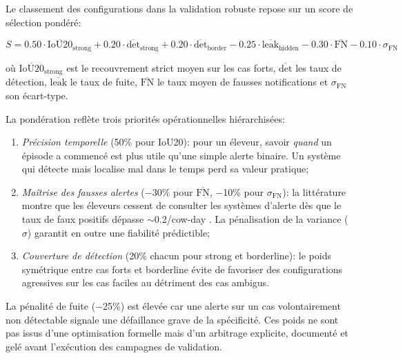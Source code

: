 Le classement des configurations dans la validation robuste repose sur un score de
sélection pondéré:

\begin{equation}
    S = 0.50 \cdot \overline{\text{IoU20}}_{\text{strong}}
      + 0.20 \cdot \overline{\text{det}}_{\text{strong}}
      + 0.20 \cdot \overline{\text{det}}_{\text{border}}
      - 0.25 \cdot \overline{\text{leak}}_{\text{hidden}}
      - 0.30 \cdot \overline{\text{FN}}
      - 0.10 \cdot \sigma_{\text{FN}}
    \label{eq:selection_score}
\end{equation}

\noindent
où $\overline{\text{IoU20}}_{\text{strong}}$ est le recouvrement strict moyen sur les cas
forts, $\overline{\text{det}}$ les taux de détection, $\overline{\text{leak}}$ le taux de
fuite, $\overline{\text{FN}}$ le taux moyen de fausses notifications et $\sigma_{\text{FN}}$
son écart-type.

La pondération reflète trois priorités opérationnelles hiérarchisées:
\begin{enumerate}
    \item \textit{Précision temporelle} (50\% pour IoU20): pour un éleveur, savoir
    \textit{quand} un épisode a commencé est plus utile qu'une simple alerte binaire.
    Un système qui détecte mais localise mal dans le temps perd sa valeur pratique;
    \item \textit{Maîtrise des fausses alertes} ($-$30\% pour $\overline{\text{FN}}$,
    $-$10\% pour $\sigma_{\text{FN}}$): la littérature montre que les éleveurs cessent
    de consulter les systèmes d'alerte dès que le taux de faux positifs dépasse
    $\sim$0.2/cow-day \citep{rutten2013invited}. La pénalisation de la variance
    ($\sigma$) garantit en outre une fiabilité prédictible;
    \item \textit{Couverture de détection} (20\% chacun pour strong et borderline):
    le poids symétrique entre cas forts et borderline évite de favoriser des configurations
    agressives sur les cas faciles au détriment des cas ambigus.
\end{enumerate}
La pénalité de fuite ($-$25\%) est élevée car une alerte sur un cas volontairement non
détectable signale une défaillance grave de la spécificité. Ces poids ne sont pas issus
d'une optimisation formelle mais d'un arbitrage explicite, documenté et gelé avant
l'exécution des campagnes de validation.


